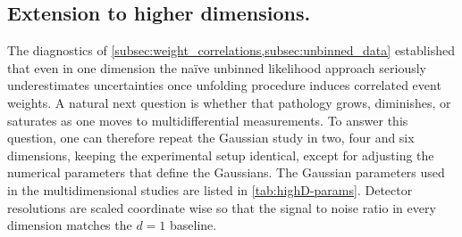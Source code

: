     \subsection{Extension to higher dimensions.}
    \label{sec:highD_extension}
        The diagnostics of \cref{subsec:weight_correlations,subsec:unbinned_data} established that even in {one} dimension the na\"ive unbinned likelihood approach
        seriously underestimates uncertainties once unfolding procedure induces correlated event weights.
        A natural next question is whether that pathology grows, diminishes, or saturates as one moves to multidifferential measurements.
        To answer this question, one can therefore repeat the Gaussian study in two, four and six dimensions, keeping the experimental setup identical, except for adjusting the numerical parameters that define the Gaussians.
        The Gaussian parameters used in the multidimensional studies are listed in \cref{tab:highD-params}.
        Detector resolutions are scaled coordinate wise so that the signal to noise ratio in every dimension matches the \(d=1\) baseline.

